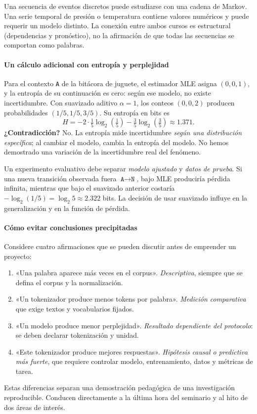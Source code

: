\begin{idea}
Una secuencia de eventos discretos puede estudiarse con una cadena de Markov. Una serie temporal de presión o temperatura contiene valores numéricos y puede requerir un modelo distinto. La conexión entre ambos cursos es estructural (dependencias y pronóstico), no la afirmación de que todas las secuencias se comportan como palabras.
\end{idea}

\paragraph{Un cálculo adicional con entropía y perplejidad}
Para el contexto \texttt{A} de la bitácora de juguete, el estimador MLE asigna $(0,0,1)$, y la entropía de su continuación es cero: según ese modelo, no existe incertidumbre. Con suavizado aditivo $\alpha=1$, los conteos $(0,0,2)$ producen probabilidades $(1/5,1/5,3/5)$. Su entropía en bits es
\[
H=-2\cdot\tfrac15\log_2(\tfrac15)-\tfrac35\log_2(\tfrac35)\approx1.371.
\]
\textbf{¿Contradicción?} No. La entropía mide incertidumbre \emph{según una distribución específica}; al cambiar el modelo, cambia la entropía del modelo. No hemos demostrado una variación de la incertidumbre real del fenómeno.

Un experimento evaluativo debe separar \emph{modelo ajustado} y \emph{datos de prueba}. Si una nueva transición observada fuera $\texttt{A}\to\texttt{N}$, bajo MLE produciría pérdida infinita, mientras que bajo el suavizado anterior costaría $-\log_2(1/5)=\log_2 5\approx2.322$ bits. La decisión de usar suavizado influye en la generalización y en la función de pérdida.

\paragraph{Cómo evitar conclusiones precipitadas}
Considere cuatro afirmaciones que se pueden discutir antes de emprender un proyecto:
\begin{enumerate}
\item «Una palabra aparece más veces en el corpus». \emph{Descriptiva}, siempre que se defina el corpus y la normalización.
\item «Un tokenizador produce menos tokens por palabra». \emph{Medición comparativa} que exige textos y vocabularios fijados.
\item «Un modelo produce menor perplejidad». \emph{Resultado dependiente del protocolo}: se deben declarar tokenización y unidad.
\item «Este tokenizador produce mejores respuestas». \emph{Hipótesis causal o predictiva más fuerte}, que requiere controlar modelo, entrenamiento, datos y métricas de tarea.
\end{enumerate}
Estas diferencias separan una demostración pedagógica de una investigación reproducible. Conducen directamente a la última hora del seminario y al hito de dos áreas de interés.




